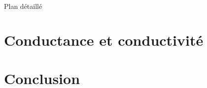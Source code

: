 \begin{reportBlock}{Plan détaillé}
\section{Conductance et conductivité}

\section{}

\subsection{}


\section{Conclusion}

\end{reportBlock}


